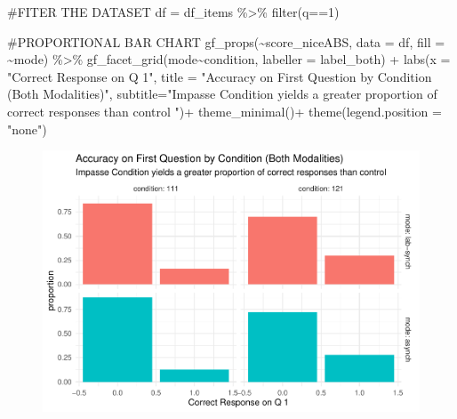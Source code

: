 \documentclass[
  letterpaper,
  DIV=11,
  numbers=noendperiod]{scrreprt}
\newenvironment{Shaded}{\begin{snugshade}}{\end{snugshade}}
\newcommand{\AttributeTok}[1]{\textcolor[rgb]{0.40,0.45,0.13}{#1}}
\newcommand{\CommentTok}[1]{\textcolor[rgb]{0.37,0.37,0.37}{#1}}
\newcommand{\DecValTok}[1]{\textcolor[rgb]{0.68,0.00,0.00}{#1}}
\newcommand{\FunctionTok}[1]{\textcolor[rgb]{0.28,0.35,0.67}{#1}}
\newcommand{\NormalTok}[1]{\textcolor[rgb]{0.00,0.23,0.31}{#1}}
\newcommand{\OtherTok}[1]{\textcolor[rgb]{0.00,0.23,0.31}{#1}}
\newcommand{\SpecialCharTok}[1]{\textcolor[rgb]{0.37,0.37,0.37}{#1}}
\newcommand{\StringTok}[1]{\textcolor[rgb]{0.13,0.47,0.30}{#1}}
\begin{document}
\begin{Shaded}
\begin{Highlighting}[]
\CommentTok{\#FITER THE DATASET}
\NormalTok{df }\OtherTok{=}\NormalTok{ df\_items }\SpecialCharTok{\%\textgreater{}\%} \FunctionTok{filter}\NormalTok{(q}\SpecialCharTok{==}\DecValTok{1}\NormalTok{) }

\CommentTok{\#PROPORTIONAL BAR CHART}
\FunctionTok{gf\_props}\NormalTok{(}\SpecialCharTok{\textasciitilde{}}\NormalTok{score\_niceABS, }\AttributeTok{data =}\NormalTok{ df, }\AttributeTok{fill =} \SpecialCharTok{\textasciitilde{}}\NormalTok{mode) }\SpecialCharTok{\%\textgreater{}\%} 
  \FunctionTok{gf\_facet\_grid}\NormalTok{(mode}\SpecialCharTok{\textasciitilde{}}\NormalTok{condition, }\AttributeTok{labeller =}\NormalTok{ label\_both) }\SpecialCharTok{+}
  \FunctionTok{labs}\NormalTok{(}\AttributeTok{x =} \StringTok{"Correct Response on Q 1"}\NormalTok{,}
       \AttributeTok{title =} \StringTok{"Accuracy on First Question by Condition (Both Modalities)"}\NormalTok{,}
       \AttributeTok{subtitle=}\StringTok{"Impasse Condition yields a greater proportion of correct responses than control "}\NormalTok{)}\SpecialCharTok{+}
  \FunctionTok{theme\_minimal}\NormalTok{()}\SpecialCharTok{+} \FunctionTok{theme}\NormalTok{(}\AttributeTok{legend.position =} \StringTok{"none"}\NormalTok{)}
\end{Highlighting}
\end{Shaded}

\begin{figure}[H]

{\centering \includegraphics{analysis/SGC3A/4_sgc3A_hypotesting_files/figure-pdf/VIS-Q1ACC.by.COND-bar-1.pdf}

}

\end{figure}
\end{document}
